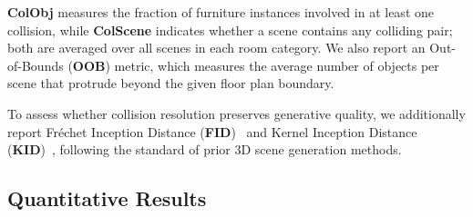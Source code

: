 \textbf{ColObj} measures the fraction of furniture instances involved in at least one collision, while \textbf{ColScene} indicates whether a scene contains any colliding pair; both are averaged over all scenes in each room category. We also report an Out-of-Bounds (\textbf{OOB}) metric, which measures the average number of objects per scene that protrude beyond the given floor plan boundary.

To assess whether collision resolution preserves generative quality, we additionally report Fr\'echet Inception Distance (\textbf{FID})~\cite{heusel2018ganstrainedtimescaleupdate} and Kernel Inception Distance (\textbf{KID})~\cite{binkowski2021demystifyingmmdgans}, following the standard of prior 3D scene generation methods.




\subsection{Quantitative Results}
